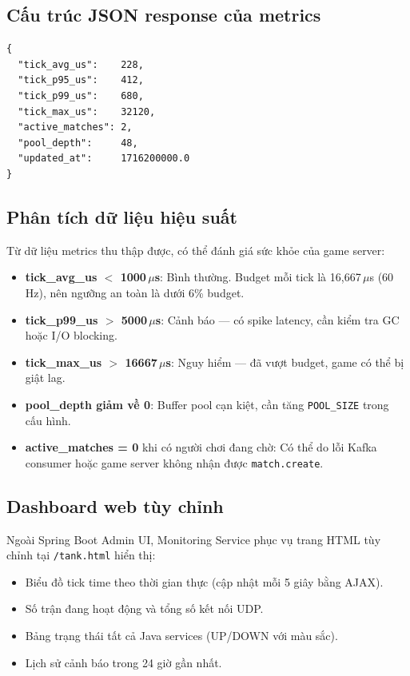 \documentclass[12pt,a4paper]{report}
\newcommand{\topic}[1]{\texttt{\textcolor{micropurple}{#1}}}
\begin{document}
\subsection{Cấu trúc JSON response của metrics}

\begin{lstlisting}[style=jsonStyle, caption={Cấu trúc JSON trả về từ GET /api/tank/metrics}, label={lst:metricsresp}]
{
  "tick_avg_us":    228,
  "tick_p95_us":    412,
  "tick_p99_us":    680,
  "tick_max_us":    32120,
  "active_matches": 2,
  "pool_depth":     48,
  "updated_at":     1716200000.0
}
\end{lstlisting}

\subsection{Phân tích dữ liệu hiệu suất}

Từ dữ liệu metrics thu thập được, có thể đánh giá sức khỏe của game server:

\begin{itemize}
  \item \textbf{tick\_avg\_us $<$ 1000\,$\mu$s}: Bình thường. Budget mỗi tick là 16,667\,$\mu$s (60\,Hz), nên ngưỡng an toàn là dưới 6\% budget.
  \item \textbf{tick\_p99\_us $>$ 5000\,$\mu$s}: Cảnh báo --- có spike latency, cần kiểm tra GC hoặc I/O blocking.
  \item \textbf{tick\_max\_us $>$ 16667\,$\mu$s}: Nguy hiểm --- đã vượt budget, game có thể bị giật lag.
  \item \textbf{pool\_depth giảm về 0}: Buffer pool cạn kiệt, cần tăng \texttt{POOL\_SIZE} trong cấu hình.
  \item \textbf{active\_matches = 0} khi có người chơi đang chờ: Có thể do lỗi Kafka consumer hoặc game server không nhận được \topic{match.create}.
\end{itemize}

\subsection{Dashboard web tùy chỉnh}

Ngoài Spring Boot Admin UI, Monitoring Service phục vụ trang HTML tùy chỉnh tại \texttt{/tank.html} hiển thị:

\begin{itemize}
  \item Biểu đồ tick time theo thời gian thực (cập nhật mỗi 5 giây bằng AJAX).
  \item Số trận đang hoạt động và tổng số kết nối UDP.
  \item Bảng trạng thái tất cả Java services (UP/DOWN với màu sắc).
  \item Lịch sử cảnh báo trong 24 giờ gần nhất.
\end{itemize}
\end{document}
